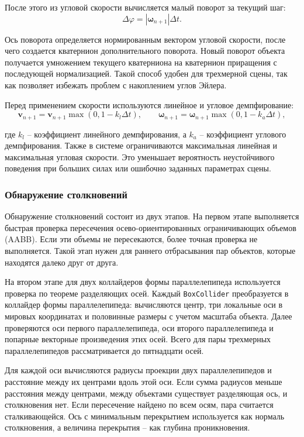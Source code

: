 После этого из угловой скорости вычисляется малый поворот за текущий шаг:
\[
\Delta \varphi = |\boldsymbol{\omega}_{n+1}|\Delta t.
\]

Ось поворота определяется нормированным вектором угловой скорости, после чего
создается кватернион дополнительного поворота. Новый поворот объекта получается
умножением текущего кватерниона на кватернион приращения с последующей
нормализацией. Такой способ удобен для трехмерной сцены, так как позволяет
избежать проблем с накоплением углов Эйлера.

Перед применением скорости используются линейное и угловое демпфирование:
\[
\mathbf{v}_{n+1}=\mathbf{v}_{n+1}\max(0,1-k_l\Delta t),
\qquad
\boldsymbol{\omega}_{n+1}=\boldsymbol{\omega}_{n+1}\max(0,1-k_a\Delta t),
\]

где \(k_l\) -- коэффициент линейного демпфирования, а \(k_a\) -- коэффициент
углового демпфирования. Также в системе ограничиваются максимальная линейная
и максимальная угловая скорости. Это уменьшает вероятность неустойчивого
поведения при больших силах или ошибочно заданных параметрах сцены.

\subsubsection{Обнаружение столкновений}

Обнаружение столкновений состоит из двух этапов. На первом этапе выполняется
быстрая проверка пересечения осево-ориентированных ограничивающих объемов
(AABB). Если эти объемы не пересекаются, более точная проверка не выполняется.
Такой этап нужен для раннего отбрасывания пар объектов, которые находятся далеко
друг от друга.

На втором этапе для двух коллайдеров формы параллелепипеда используется проверка
по теореме разделяющих осей. Каждый \texttt{BoxCollider} преобразуется в
коллайдер формы параллелепипеда: вычисляются центр, три
локальные оси в мировых координатах и половинные размеры с учетом масштаба
объекта. Далее проверяются оси первого параллелепипеда, оси второго
параллелепипеда и попарные векторные произведения этих осей. Всего для пары
трехмерных параллелепипедов рассматривается до пятнадцати осей.

Для каждой оси вычисляются радиусы проекции двух параллелепипедов и расстояние
между их центрами вдоль этой оси. Если сумма радиусов меньше расстояния между
центрами, между объектами существует разделяющая ось, и столкновения нет. Если
пересечение найдено по всем осям, пара считается сталкивающейся. Ось с минимальным
перекрытием используется как нормаль столкновения, а величина перекрытия -- как
глубина проникновения.

